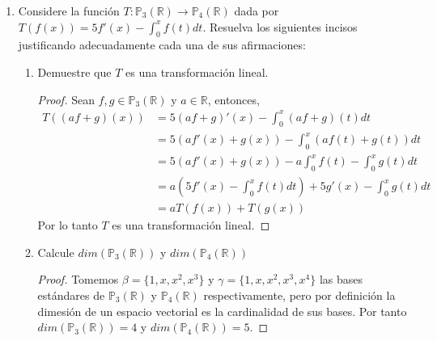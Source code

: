 \documentclass[11pt,letterpaper]{article}
\newcommand{\R}{\mathbb{R}}
\begin{document}
\begin{enumerate}
\begin{enumerate}[label=(\alph*)]
    \item $\beta_1 \cup \beta_2$ es una base de $V$
    \begin{proof}
        Consideremos $\beta = \beta_1 \cup \beta_2 = \{ v_1, \ldots, v_m, w_1, \ldots, w_m \}$. Los
        vectores de $\beta$ son linealmente independientes, ya que si
        $(a_1v_1 + \cdots + a_nv_m) + (b_1 w_1 + \cdots + b_nw_m) = 0$, entonces el primer vector
        está en $W_1$ y el segundo en $W_2$ así
        $a_1v_1 + \cdots + a_nv_m = b_1 w_1 + \cdots + b_nw_m = 0$. Como $\beta_1, \beta_2$ son bases,
        nos da que $a_1 = \cdots = a_n = 0$ y $b_1 = \cdots = b_n = 0$. Los vectores de $\beta$
        también generan a $V$ porque $V = W_1 \oplus W_2$ lo que significa que cada vector $v \in V$
        puede escribirse como $v = x + y$ con $x \in W_1$ y $t \in W_2$. Pero $\beta_1, \beta_2$ son
        bases para $W_1$ y $W_2$ respectivamente, entonces
        $v = x + y = a_1v_1 + \cdots + a_nv_m = b_1 w_1 + \cdots + b_nw_m$ para algunos coeficientes
        $a_i$ y $b_j$. Por tanto $\beta_1 \cup \beta_2$ son una base pasa $V$.
    \end{proof}
\end{enumerate}

\item Considere la función $T : \mathds{P}_3(\R) \to \mathds{P}_4(\R)$ dada por
$T(f(x)) = 5f'(x) - \int_{0}^{x} f(t)dt$. Resuelva los siguientes incisos justificando adecuadamente
cada una de sus afirmaciones:
\begin{enumerate}[label=(\alph*)]
    \item Demuestre que $T$ es una transformación lineal.
    \begin{proof}
        Sean $f,g \in \mathds{P}_3(\R)$ y $a \in \R$, entonces,
        \begin{align*}
            T((af+g)(x))
                &= 5(af+g)'(x) - \int_{0}^{x} (af+g)(t)dt\\
                &= 5(af'(x)+g(x)) - \int_{0}^{x} (af(t) + g(t)) dt\\
                &= 5(af'(x)+g(x)) - a\int_{0}^{x} f(t) - \int_{0}^{x} g(t) dt\\
                &= a(5f'(x) - \int_{0}^{x} f(t)dt) + 5g'(x) - \int_{0}^{x} g(t) dt\\
                &= aT(f(x)) + T(g(x))
        \end{align*}
        Por lo tanto $T$ es una transformación lineal.
    \end{proof}

    \item Calcule $dim (\mathds{P}_3(\R))$ y $dim (\mathds{P}_4(\R))$
    \begin{proof}
        Tomemos $\beta = \{ 1, x, x^2, x^3 \}$ y $\gamma = \{ 1, x, x^2, x^3, x^4 \}$ las bases
        estándares de $\mathds{P}_3(\R)$ y $\mathds{P}_4(\R)$ respectivamente, pero por definición
        la dimesión de un espacio vectorial es la cardinalidad de sus bases. Por tanto
        $dim (\mathds{P}_3(\R)) = 4$ y $dim (\mathds{P}_4(\R)) = 5$.
    \end{proof}


\end{enumerate}
\end{enumerate}
\end{document}
